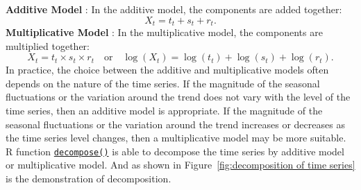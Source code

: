 \documentclass{article}\usepackage[]{graphicx}\usepackage[]{xcolor}
\numberwithin{equation}{section}
\begin{document}
\noindent \textbf{Additive Model} \cite{Brockwell2016Introduction}: In the additive model, the components are added together:
\[
X_t = t_t + s_t + r_t.
\]
\textbf{Multiplicative Model} \cite{Brockwell2016Introduction}: In the multiplicative model, the components are multiplied together:
\[
X_t = t_t \times s_t \times r_t \quad \text{or} \quad \log(X_t) = \log(t_t) + \log(s_t) + \log(r_t).
\]
In practice, the choice between the additive and multiplicative models often depends on the nature of the time series. If the magnitude of the seasonal fluctuations or the variation around the trend does not vary with the level of the time series, then an additive model is appropriate. If the magnitude of the seasonal fluctuations or the variation around the trend increases or decreases as the time series level changes, then a multiplicative model may be more suitable.\\

\noindent
R function \href{https://www.rdocumentation.org/packages/stats/versions/3.6.2/topics/decompose}{\texttt{decompose()}} is able to decompose the time series by additive model or multiplicative model. And as shown in Figure~\ref{fig:decomposition of time series} is the demonstration of decomposition.
\end{document}
